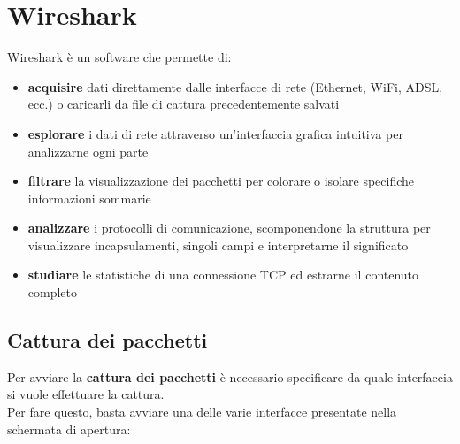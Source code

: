 \documentclass[12pt, a4paper, oneside]{book}
\begin{document}

    \section{Wireshark}
    Wireshark è un software che permette di:
    \begin{itemize}[label=$\triangleright$]
      \item \textbf{acquisire} dati direttamente dalle interfacce di rete (Ethernet, WiFi, ADSL, ecc.) o caricarli da file di cattura precedentemente salvati
      \smallskip
      \item \textbf{esplorare} i dati di rete attraverso un'interfaccia grafica intuitiva per analizzarne ogni parte
      \smallskip
      \item \textbf{filtrare} la visualizzazione dei pacchetti per colorare o isolare specifiche informazioni sommarie
      \smallskip
      \item \textbf{analizzare} i protocolli di comunicazione, scomponendone la struttura per visualizzare incapsulamenti, singoli campi e interpretarne il significato
      \smallskip
      \item \textbf{studiare} le statistiche di una connessione TCP ed estrarne il contenuto completo
    \end{itemize}


    \subsection{Cattura dei pacchetti}
    Per avviare la \textcolor{azzurrino}{\textbf{cattura dei pacchetti}} è necessario specificare da quale interfaccia si vuole effettuare la cattura.\\[0.2ex]
    Per fare questo, basta avviare una delle varie interfacce presentate nella schermata di apertura:
\end{document}
